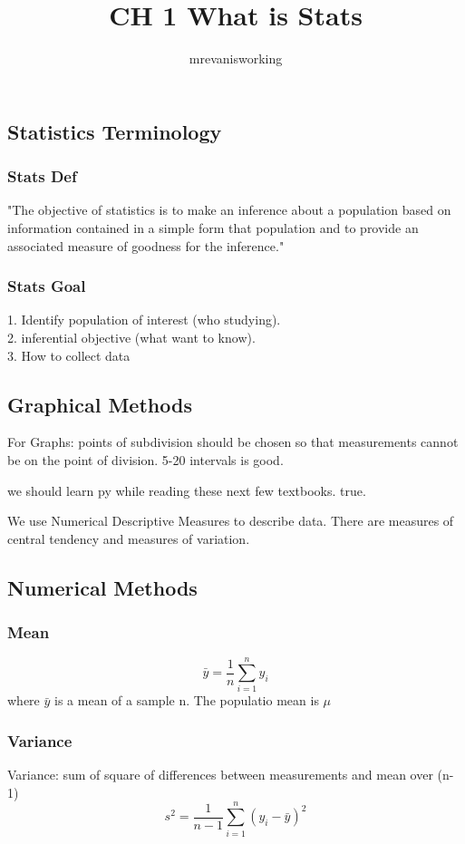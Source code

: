 \documentclass[12pt]{article}
\begin{document}
\title{CH 1 What is Stats}
\author{mrevanisworking}
\maketitle

\subsection{Statistics Terminology}
    \subsubsection{Stats Def}
    "The objective of statistics is to make an inference about a population based on
    information contained in a simple form that population and to
    provide an associated measure of goodness for the inference."
    \subsubsection{Stats Goal}
        1. Identify population of interest (who studying). \\
        2. inferential objective (what want to know).\\
        3. How to collect data
\subsection{Graphical Methods}
    For Graphs: points of subdivision should be chosen so that measurements 
    cannot be on the point of division. 5-20 intervals is good.
    \par
    we should learn py while reading these next few textbooks. true.
    \par
    We use Numerical Descriptive Measures to describe data. There are measures of central
    tendency and measures of variation.
\subsection{Numerical Methods}
    \subsubsection{Mean}
        \begin{equation}
            \bar y= \frac{1}{n} \sum_{i=1}^{n} y_i
        \end{equation}
        where $\bar y$  is a mean of a sample n. The populatio mean is $ \mu  $
    \subsubsection{Variance}
        Variance: sum of square of differences between measurements
        and mean over (n-1)
        \begin{equation}
            s ^{2} = \frac{1}{n-1} \sum_{i=1}^{n}(y _{i} - \bar y) ^{2}
        \end{equation}
\end{document}
